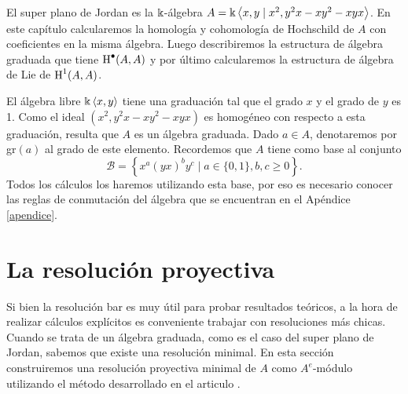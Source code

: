 \documentclass[fleqn,../tesis.tex]{subfiles}
\begin{document}
El super plano de Jordan es la $\Bbbk$-álgebra $A = \Bbbk\left\langle x, y \mid x^2, y^2x - xy^2 - xyx \right\rangle$.
En este capítulo calcularemos la homología y cohomología de Hochschild de $A$ con coeficientes en la misma
álgebra. Luego describiremos la estructura de álgebra graduada que tiene $\operatorname{H}^{\bullet}(A,A)$ y
por último calcularemos la estructura de álgebra de Lie de $\operatorname{H}^{1}(A, A)$.

El álgebra libre $\Bbbk\left\langle x, y \right\rangle$ tiene una graduación tal que el grado $x$ y el grado de $y$ es 1.
Como el ideal $(x^2, y^2x - xy^2 - xyx)$ es homogéneo con respecto a esta graduación,
resulta que $A$ es un álgebra graduada. Dado $a \in A$, denotaremos por gr$(a)$ al grado
de este elemento. Recordemos que $A$ tiene como base al conjunto
\[
	\mathcal{B} = \left\lbrace x^{a}(yx)^{b}y^c \mid a \in \lbrace 0, 1 \rbrace, b, c \geq 0\right\rbrace.
\]
Todos los cálculos los haremos utilizando esta base, por eso es necesario conocer las reglas de conmutación
del álgebra que se encuentran en el Apéndice \ref{apendice}.

\section{La resolución proyectiva}
Si bien la resolución bar es muy útil para probar resultados teóricos, a la hora de realizar cálculos explícitos
es conveniente trabajar con resoluciones más chicas. Cuando se trata de un álgebra graduada, como es el caso
del super plano de Jordan, sabemos que existe una resolución minimal. En esta sección construiremos
una resolución proyectiva minimal de $A$ como $A^e$-módulo utilizando el método desarrollado
en el articulo \cite{CS}.
\end{document}
